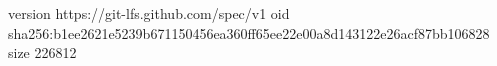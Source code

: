 version https://git-lfs.github.com/spec/v1
oid sha256:b1ee2621e5239b671150456ea360ff65ee22e00a8d143122e26acf87bb106828
size 226812
